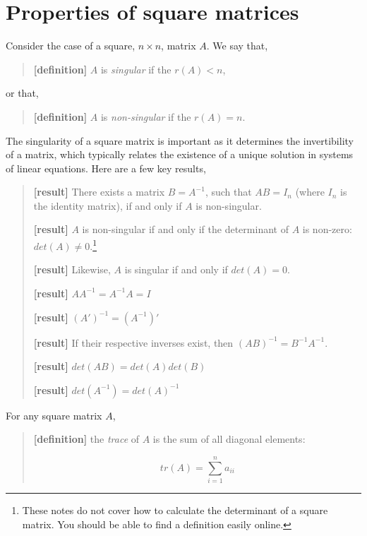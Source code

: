 \documentclass[
  letterpaper,
  DIV=11,
  numbers=noendperiod]{scrreprt}
\begin{document}
\hypertarget{properties-of-square-matrices}{%
\section{Properties of square
matrices}\label{properties-of-square-matrices}}

Consider the case of a square, \(n\times n\), matrix \(A\). We say that,

\begin{quote}
\textbf{{[}definition{]}} \(A\) is \emph{singular} if the \(r(A)<n\),
\end{quote}

or that,

\begin{quote}
\textbf{{[}definition{]}} \(A\) is \emph{non-singular} if the
\(r(A)=n\).
\end{quote}

The singularity of a square matrix is important as it determines the
invertibility of a matrix, which typically relates the existence of a
unique solution in systems of linear equations. Here are a few key
results,

\begin{quote}
\textbf{{[}result{]}} There exists a matrix \(B=A^{-1}\), such that
\(AB=I_n\) (where \(I_n\) is the identity matrix), if and only if \(A\)
is non-singular.

\textbf{{[}result{]}} \(A\) is non-singular if and only if the
determinant of \(A\) is non-zero: \(det(A)\neq0\).\footnote{These notes
  do not cover how to calculate the determinant of a square matrix. You
  should be able to find a definition easily online.}

\textbf{{[}result{]}} Likewise, \(A\) is singular if and only if
\(det(A)=0\).

\textbf{{[}result{]}} \(AA^{-1}=A^{-1}A=I\)

\textbf{{[}result{]}} \((A')^{-1}=(A^{-1})'\)

\textbf{{[}result{]}} If their respective inverses exist, then
\((AB)^{-1}=B^{-1}A^{-1}\).

\textbf{{[}result{]}} \(det(AB)=det(A)det(B)\)

\textbf{{[}result{]}} \(det(A^{-1})=det(A)^{-1}\)
\end{quote}

For any square matrix \(A\),

\begin{quote}
\textbf{{[}definition{]}} the \emph{trace} of \(A\) is the sum of all
diagonal elements:

\[
tr(A) = \sum_{i=1}^na_{ii}
\]
\end{quote}
\end{document}
